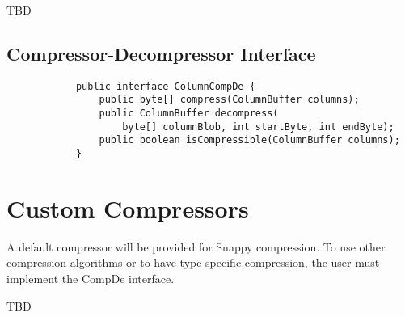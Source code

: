 \documentclass[11pt,a4paper]{article}
\begin{document}
			TBD
			
	\subsection{Compressor-Decompressor Interface}
		\begin{verbatim}
			public interface ColumnCompDe {
			    public byte[] compress(ColumnBuffer columns);
			    public ColumnBuffer decompress(
			        byte[] columnBlob, int startByte, int endByte);
			    public boolean isCompressible(ColumnBuffer columns);
			}
		\end{verbatim}

			
\section{Custom Compressors}
		A default compressor will be provided for Snappy compression.
		To use other compression algorithms or to have type-specific compression, the user must implement the CompDe interface.
		
		TBD
		
\end{document}
